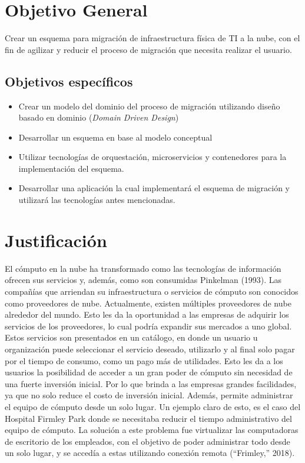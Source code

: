 \documentclass[12pt,twoside]{reedthesis}
\theoremstyle{definition}
\theoremstyle{definition}
\theoremstyle{definition}
\theoremstyle{remark}
\begin{document}
\hypertarget{objetivo-general}{%
\section{Objetivo General}\label{objetivo-general}}

Crear un esquema para migración de infraestructura física de TI a la
nube, con el fin de agilizar y reducir el proceso de migración que
necesita realizar el usuario.

\hypertarget{objetivos-especificos}{%
\subsection{Objetivos específicos}\label{objetivos-especificos}}
\begin{itemize}
\item
  Crear un modelo del dominio del proceso de migración utilizando diseño
  basado en dominio (\emph{Domain Driven Design})
\item
  Desarrollar un esquema en base al modelo conceptual
\item
  Utilizar tecnologías de orquestación, microservicios y contenedores
  para la implementación del esquema.
\item
  Desarrollar una aplicación la cual implementará el esquema de
  migración y utilizará las tecnologías antes mencionadas.
\end{itemize}
\hypertarget{justificacion}{%
\section{Justificación}\label{justificacion}}

El cómputo en la nube ha transformado como las tecnologías de
información ofrecen sus servicios y, además, como son consumidas
Pinkelman (1993). Las compañías que arriendan su infraestructura o
servicios de cómputo son conocidos como proveedores de nube.
Actualmente, existen múltiples proveedores de nube alrededor del mundo.
Esto les da la oportunidad a las empresas de adquirir los servicios de
los proveedores, lo cual podría expandir sus mercados a uno global.
Estos servicios son presentados en un catálogo, en donde un usuario u
organización puede seleccionar el servicio deseado, utilizarlo y al
final solo pagar por el tiempo de consumo, como un pago más de
utilidades. Esto les da a los usuarios la posibilidad de acceder a un
gran poder de cómputo sin necesidad de una fuerte inversión inicial. Por
lo que brinda a las empresas grandes facilidades, ya que no solo reduce
el costo de inversión inicial. Además, permite administrar el equipo de
cómputo desde un solo lugar. Un ejemplo claro de esto, es el caso del
Hospital Firmley Park donde se necesitaba reducir el tiempo
administrativo del equipo de cómputo. La solución a este problema fue
virtualizar las computadoras de escritorio de los empleados, con el
objetivo de poder administrar todo desde un solo lugar, y se accedía a
estas utilizando conexión remota (``Frimley,'' 2018).
\end{document}
